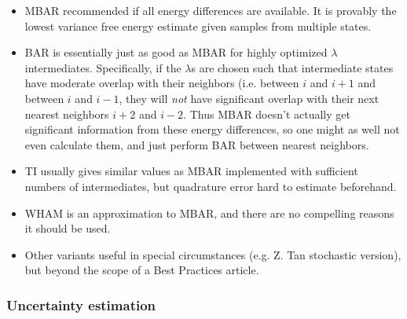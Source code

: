 \documentclass[9pt,bestpractices]{livecoms}
\begin{document}
\begin{itemize}
\item MBAR recommended if all energy differences are available. It is provably the lowest variance free energy estimate given samples from multiple states.
\item BAR is essentially just as good as MBAR for highly optimized $\lambda$ intermediates.  Specifically, if the $\lambda$s are chosen such that intermediate states have moderate overlap with their neighbors (i.e. between $i$ and $i+1$ and between $i$ and $i-1$, they will \textit{not} have significant overlap with their next nearest neighbors $i+2$ and $i-2$. Thus MBAR doesn't actually get significant information from these energy differences, so one might as well not even calculate them, and just perform BAR between nearest neighbors.~\cite{paliwal.benchmark} 
\item TI usually gives similar values as MBAR implemented with sufficient numbers of intermediates, but quadrature error hard to estimate beforehand.~\cite{paliwal.benchmark}
\item WHAM is an approximation to MBAR, and there are no compelling reasons it should be used. 
\item Other variants useful in special circumstances (e.g. Z. Tan stochastic version), but beyond the scope of a Best Practices article.
\end{itemize}


\subsubsection*{Uncertainty estimation}
\end{document}
